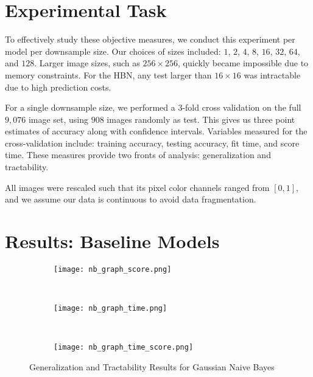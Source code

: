 \documentclass{article}
\begin{document}



\section{Experimental Task}
\label{sec:task}
To effectively study these objective measures, we conduct this experiment
per model per downsample size. Our choices of sizes
included: $1$, $2$, $4$, $8$, $16$, $32$, $64$, and $128$. Larger image sizes,
such as $256 \times 256$, quickly became impossible due to memory constraints.
For the HBN, any test larger than $16 \times 16$ was intractable
due to high prediction costs.

For a single downsample size, we performed a $3$-fold cross validation on
the full $9,076$ image set, using $908$
images randomly as test. This gives us three point estimates of accuracy along
with confidence intervals. Variables measured for the
cross-validation include: training accuracy, testing accuracy, fit time, and
score time. These measures provide two fronts of analysis: generalization and
tractability.

All images were rescaled such that its pixel color channels ranged from
$[0, 1]$, and we assume our data is continuous to avoid data
fragmentation.


\section{Results: Baseline Models}

\label{sec:results-baseline}

\begin{figure}
  \centering
  \begin{subfigure}[b]{0.3\textwidth}
    \centering
    \texttt{[image: nb\_graph\_score.png]}
    \caption*{}
    \label{fig:nb_graph_score}
  \end{subfigure}
  ~
  \begin{subfigure}[b]{0.3\textwidth}
    \centering
    \texttt{[image: nb\_graph\_time.png]}
    \caption*{}
    \label{fig:nb_graph_time}
  \end{subfigure}
  ~
  \begin{subfigure}[b]{0.3\textwidth}
    \centering
    \texttt{[image: nb\_graph\_time\_score.png]}
    \caption*{}
    \label{fig:nb_graph_time_score}
  \end{subfigure}
  \vspace{-20pt}
  \caption{Generalization and Tractability Results for Gaussian Naive Bayes}
  \label{fig:GNB}
\end{figure}
\end{document}
